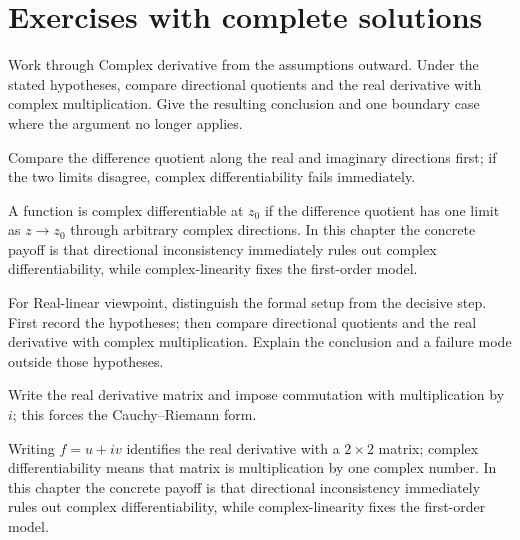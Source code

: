 \section{Exercises with complete solutions}

\begin{exercise}\label{exr:iv01-01}
Work through Complex derivative from the assumptions outward. Under the stated hypotheses, compare directional quotients and the real derivative with complex multiplication. Give the resulting conclusion and one boundary case where the argument no longer applies.
\end{exercise}
\begin{hint}
Compare the difference quotient along the real and imaginary directions first; if the two limits disagree, complex differentiability fails immediately.
\end{hint}
\begin{solution}
A function is complex differentiable at $z_0$ if the difference quotient has one limit as $z\to z_0$ through arbitrary complex directions. In this chapter the concrete payoff is that directional inconsistency immediately rules out complex differentiability, while complex-linearity fixes the first-order model.
\end{solution}

\begin{exercise}\label{exr:iv01-02}
For Real-linear viewpoint, distinguish the formal setup from the decisive step. First record the hypotheses; then compare directional quotients and the real derivative with complex multiplication. Explain the conclusion and a failure mode outside those hypotheses.
\end{exercise}
\begin{hint}
Write the real derivative matrix and impose commutation with multiplication by \(i\); this forces the Cauchy--Riemann form.
\end{hint}
\begin{solution}
Writing $f=u+iv$ identifies the real derivative with a $2\times2$ matrix; complex differentiability means that matrix is multiplication by one complex number. In this chapter the concrete payoff is that directional inconsistency immediately rules out complex differentiability, while complex-linearity fixes the first-order model.
\end{solution}


